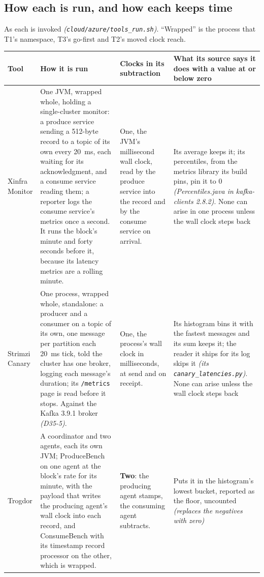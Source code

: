 \documentclass[11pt]{article}
\newcommand{\gl}[1]{{\color{soft}\itshape\small (#1)}}
\begin{document}
\subsection*{How each is run, and how each keeps time}
As each is invoked \gl{\texttt{cloud/azure/tools\_run.sh}}. ``Wrapped'' is the process that T1's
namespace, T3's go-first and T2's moved clock reach.

{\small
\begin{longtable}{@{}>{\raggedright\arraybackslash}p{2.6cm} >{\raggedright\arraybackslash}p{5.2cm} >{\raggedright\arraybackslash}p{3.2cm} >{\raggedright\arraybackslash}p{4.4cm}@{}}
\toprule
\textbf{Tool} & \textbf{How it is run} & \textbf{Clocks in its subtraction} & \textbf{What its source says it does with a value at or below zero} \\
\midrule
\endhead
Xinfra Monitor & One JVM, wrapped whole, holding a single-cluster monitor: a produce service sending a 512-byte record to a topic of its own every 20~ms, each waiting for its acknowledgment, and a consume service reading them; a reporter logs the consume service's metrics once a second. It runs the block's minute and forty seconds before it, because its latency metrics are a rolling minute. & One, the JVM's millisecond wall clock, read by the produce service into the record and by the consume service on arrival. & Its average keeps it; its percentiles, from the metrics library its build pins, pin it to 0 \gl{Percentiles.java in kafka-clients 2.8.2}. None can arise in one process unless the wall clock steps back \\
Strimzi Canary & One process, wrapped whole, standalone: a producer and a consumer on a topic of its own, one message per partition each 20~ms tick, told the cluster has one broker, logging each message's duration; its \texttt{/metrics} page is read before it stops. Against the Kafka 3.9.1 broker \gl{D35-5}. & One, the process's wall clock in milliseconds, at send and on receipt. & Its histogram bins it with the fastest messages and its sum keeps it; the reader it ships for its log skips it \gl{its \texttt{canary\_latencies.py}}. None can arise unless the wall clock steps back \\
Trogdor & A coordinator and two agents, each its own JVM; ProduceBench on one agent at the block's rate for its minute, with the payload that writes the producing agent's wall clock into each record, and ConsumeBench with its timestamp record processor on the other, which is wrapped. & \textbf{Two}: the producing agent stamps, the consuming agent subtracts. & Puts it in the histogram's lowest bucket, reported as the floor, uncounted \gl{replaces the negatives with zero} \\

\end{longtable}}
\end{document}
